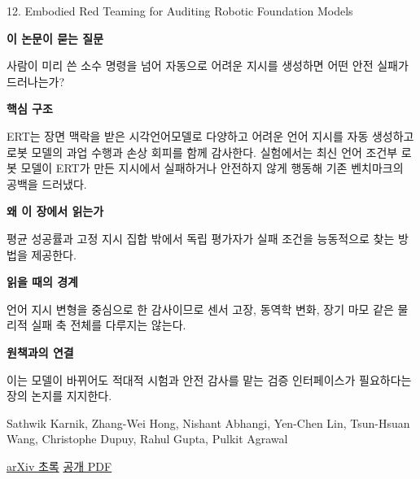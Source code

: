 \documentclass[11pt,openany]{book}
\begin{document}
\begin{termcard}{12. Embodied Red Teaming for Auditing Robotic Foundation Models}

\par

\medskip

{\sffamily\bfseries\color{deepblue} 이 논문이 묻는 질문}\par

사람이 미리 쓴 소수 명령을 넘어 자동으로 어려운 지시를 생성하면 어떤 안전 실패가 드러나는가?

\smallskip

{\sffamily\bfseries\color{deepblue} 핵심 구조}\par

ERT는 장면 맥락을 받은 시각언어모델로 다양하고 어려운 언어 지시를 자동 생성하고 로봇 모델의 과업 수행과 손상 회피를 함께 감사한다. 실험에서는 최신 언어 조건부 로봇 모델이 ERT가 만든 지시에서 실패하거나 안전하지 않게 행동해 기존 벤치마크의 공백을 드러냈다.

\smallskip

{\sffamily\bfseries\color{deepblue} 왜 이 장에서 읽는가}\par

평균 성공률과 고정 지시 집합 밖에서 독립 평가자가 실패 조건을 능동적으로 찾는 방법을 제공한다.

\smallskip

{\sffamily\bfseries\color{coral} 읽을 때의 경계}\par

언어 지시 변형을 중심으로 한 감사이므로 센서 고장, 동역학 변화, 장기 마모 같은 물리적 실패 축 전체를 다루지는 않는다.

\smallskip

{\sffamily\bfseries\color{teal} 원책과의 연결}\par

이는 모델이 바뀌어도 적대적 시험과 안전 감사를 맡는 검증 인터페이스가 필요하다는 장의 논지를 지지한다.

\medskip

{\footnotesize\color{muted} Sathwik Karnik, Zhang-Wei Hong, Nishant Abhangi, Yen-Chen Lin, Tsun-Hsuan Wang, Christophe Dupuy, Rahul Gupta, Pulkit Agrawal\par

\href{https://arxiv.org/abs/2411.18676}{arXiv 초록} \quad \href{https://arxiv.org/pdf/2411.18676}{공개 PDF}\par}

\end{termcard}
\end{document}
